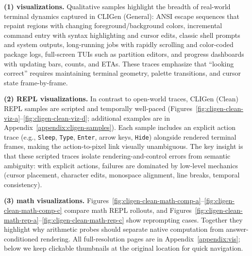 \noindent\textbf{(1) \cligenGeneralData{} visualizations.}
Qualitative samples highlight the breadth of real-world terminal dynamics captured in CLIGen (General): ANSI escape sequences that repaint regions with changing foreground/background colors, incremental command entry with syntax highlighting and cursor edits, classic shell prompts and system outputs, long-running jobs with rapidly scrolling and color-coded package logs, full-screen TUIs such as partition editors, and progress dashboards with updating bars, counts, and ETAs.
These traces emphasize that ``looking correct'' requires maintaining terminal geometry, palette transitions, and cursor state frame-by-frame.

\noindent\textbf{(2) \cligenCleanData{} REPL visualizations.}
In contrast to open-world traces, CLIGen (Clean) REPL samples are scripted and temporally well-paced (Figures~\ref{fig:cligen-clean-viz-a}--\ref{fig:cligen-clean-viz-d}; additional examples are in Appendix~\ref{appendix:cligen-samples}).
Each sample includes an explicit action trace (e.g., \texttt{Sleep}, \texttt{Type}, \texttt{Enter}, arrow keys, \texttt{Hide}) alongside rendered terminal frames, making the action-to-pixel link visually unambiguous.
The key insight is that these scripted traces isolate rendering-and-control errors from semantic ambiguity: with explicit actions, failures are dominated by low-level mechanics (cursor placement, character edits, monospace alignment, line breaks, temporal consistency).

\noindent\textbf{(3) \cligenCleanData{} math visualizations.}
Figures~\ref{fig:cligen-clean-math-comp-a}--\ref{fig:cligen-clean-math-comp-c} compare math REPL rollouts, and Figures~\ref{fig:cligen-clean-math-rep-a}--\ref{fig:cligen-clean-math-rep-c} show reprompting cases.
Together they highlight why arithmetic probes should separate native computation from answer-conditioned rendering.
All full-resolution pages are in Appendix~\ref{appendix:vis}; below we keep clickable thumbnails at the original location for quick navigation.

